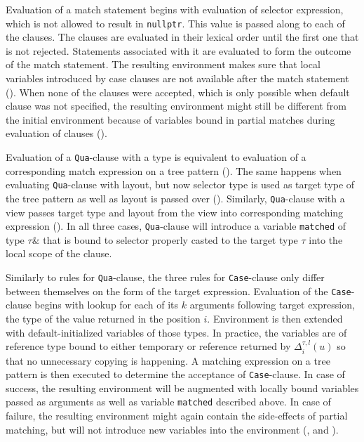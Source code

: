 \documentclass[preprint]{sigplanconf}
\makeatletter
\DeclareRobustCommand{\code}[1]{{\lstinline[breaklines=false,escapechar=@]{#1}}}
\makeatother
\begin{document}
Evaluation of a match statement begins with evaluation of selector expression, 
which is not allowed to result in \code{nullptr}. This value is passed along to 
each of the clauses. The clauses are evaluated in their lexical order until the
first one that is not rejected. Statements associated with it are evaluated to 
form the outcome of the match statement. The resulting environment makes sure 
that local variables introduced by case clauses are not available after the 
match statement (). When none of the clauses were 
accepted, which is only possible when default clause was not specified, the 
resulting environment might still be different from the initial environment 
because of variables bound in partial matches during evaluation of clauses 
().

Evaluation of a \code{Qua}-clause with a type is equivalent to evaluation of a 
corresponding match expression on a tree pattern (). The 
same happens when evaluating \code{Qua}-clause with layout, but now selector 
type is used as target type of the tree pattern as well as layout is passed 
over (). Similarly, \code{Qua}-clause with a view passes 
target type and layout from the view into corresponding matching expression 
(). In all three cases, \code{Qua}-clause will introduce a 
variable \code{matched} of type $\tau\&$ that is bound to selector properly 
casted to the target type $\tau$ into the local scope of the clause.

Similarly to rules for \code{Qua}-clause, the three rules for \code{Case}-clause 
only differ between themselves on the form of the target expression. Evaluation 
of the \code{Case}-clause begins with lookup for each of its $k$ arguments 
following target expression, the type of the value returned in the position $i$. 
Environment is then extended with default-initialized variables of those types. 
In practice, the variables are of reference type bound to either temporary or 
reference returned by $\Delta_i^{\tau,l}(u)$ so that no unnecessary copying is 
happening. A matching expression on a tree pattern is then executed to determine 
the acceptance of \code{Case}-clause. In case of success, the resulting 
environment will be augmented with locally bound variables passed as arguments 
as well as variable \code{matched} described above. In case of failure, the 
resulting environment might again contain the side-effects of partial matching, 
but will not introduce new variables into the environment (, 
 and ).
\end{document}
